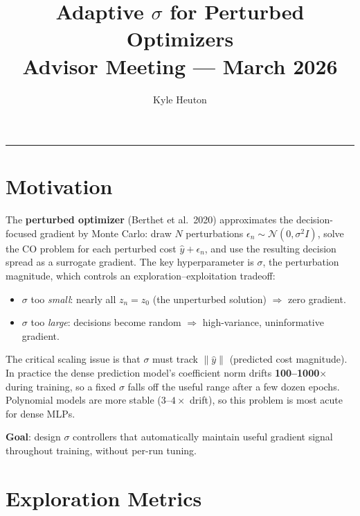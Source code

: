 \documentclass[11pt]{article}
\title{\textbf{Adaptive $\sigma$ for Perturbed Optimizers}\\
\large Advisor Meeting --- March 2026}
\author{Kyle Heuton}
\date{}
\begin{document}
\maketitle
\thispagestyle{empty}

\tableofcontents
\vspace{1em}
\hrule
\vspace{1em}

\section{Motivation}

The \textbf{perturbed optimizer} (Berthet et al.\ 2020) approximates the
decision-focused gradient by Monte Carlo: draw $N$ perturbations
$\epsilon_n \sim \mathcal{N}(0, \sigma^2 I)$, solve the CO problem
for each perturbed cost $\hat{y} + \epsilon_n$, and use the resulting
decision spread as a surrogate gradient.
The key hyperparameter is $\sigma$, the perturbation magnitude, which
controls an exploration--exploitation tradeoff:
\begin{itemize}[itemsep=2pt]
  \item $\sigma$ too \emph{small}: nearly all $z_n = z_0$ (the unperturbed
        solution) $\Rightarrow$ zero gradient.
  \item $\sigma$ too \emph{large}: decisions become random
        $\Rightarrow$ high-variance, uninformative gradient.
\end{itemize}

The critical scaling issue is that $\sigma$ must track $\|\hat{y}\|$
(predicted cost magnitude). In practice the dense prediction model's
coefficient norm drifts \textbf{100--1000$\times$} during training,
so a fixed $\sigma$ falls off the useful range after a few dozen epochs.
Polynomial models are more stable ($3$--$4\times$ drift), so this problem
is most acute for dense MLPs.

\textbf{Goal}: design $\sigma$ controllers that automatically maintain
useful gradient signal throughout training, without per-run tuning.

\section{Exploration Metrics}
\end{document}
